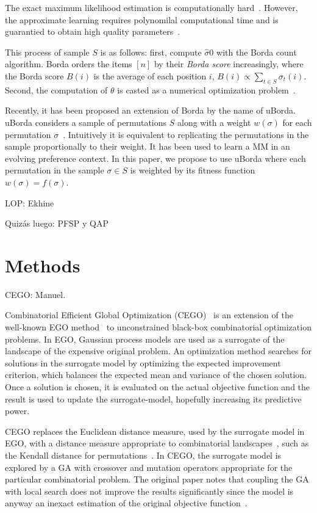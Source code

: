 \documentclass[runningheads]{llncs}
\begin{document}
The exact maximum likelihood estimation is computationally hard~\cite{Dwork:2001:RAM:371920.372165}. However, the approximate learning requires polynomilal computational time and is guarantied to obtain high quality parameters~\cite{Caragiannis2013,Coppersmith:2010}. 

This process of sample $S$ is as follows: first, compute $\hat\sigma0$ with the Borda count algorithm. Borda orders the items $[n]$ by their \textit{Borda score} increasingly, where the Borda score $B(i)$ is the average of each position $i$, $B(i) \propto \sum_{t\in S}  \sigma_t(i)$. Second, the computation of $\theta$ is casted as a numerical optimization problem~\cite{Irurozki2016b}. 

Recently, it has been proposed an extension of Borda by the name of uBorda. uBorda considers a sample of permutations $S$ along with a weight $w(\sigma)$ for each permutation $\sigma$~\cite{}. Intuitively it is equivalent to replicating the permutations in the sample proportionally to their weight. It has been used to learn a MM in an evolving preference context. In this paper, we propose to use uBorda where each permutation in the sample $\sigma\in S$ is weighted by its fitness function $w(\sigma)=f(\sigma)$.




LOP: Ekhine

Quizás luego: PFSP y QAP

\section{Methods}


CEGO: Manuel.

Combinatorial Efficient Global Optimization
(CEGO)~\citep{ZaeStoFriFisNauBar2014} is an extension of the well-known EGO
method~\citep{JonSchWel98go} to unconstrained black-box combinatorial
optimization problems. In EGO, Gaussian process models are used as a surrogate
of the landscape of the expensive original problem. An optimization method
searches for solutions in the surrogate model by optimizing the expected
improvement criterion, which balances the expected mean and variance of the
chosen solution. Once a solution is chosen, it is evaluated on the actual
objective function and the result is used to update the surrogate-model,
hopefully increasing its predictive power.

CEGO replaces the Euclidean distance measure, used by the surrogate model in
EGO, with a distance measure appropriate to combinatorial
landscapes~\citep{ZaeStoBar2014:ppsn}, such as the Kendall distance for
permutations~\citep{?}. In CEGO, the surrogate model is explored by a GA with
crossover and mutation operators appropriate for the particular combinatorial
problem. The original paper notes that coupling the GA with local search does
not improve the results significantly since the model is anyway an inexact
estimation of the original objective
function~\citep[p.~875]{ZaeStoFriFisNauBar2014}.
\end{document}
